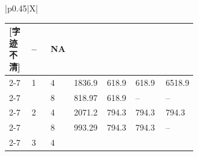\documentclass[UTF8,10pt,a4paper,fontset=fandol]{ctexart}
\newcommand{\fieldvalue}[1]{#1}
\newcommand{\handwritten}[1]{#1}
\begin{document}
\begin{tabularx}{\textwidth}{|p{0.45\textwidth}|X|}
{\begin{tabularx}{\linewidth}{|p{0.12\linewidth}|p{0.10\linewidth}|p{0.10\linewidth}|X|X|p{0.16\linewidth}|p{0.14\linewidth}|}
\fieldvalue{\handwritten{[字迹不清]}} &
-- & NA \\
\cline{2-7}
& 1 &
\fieldvalue{\handwritten{4}} &
\fieldvalue{\handwritten{1836.9}} &
\fieldvalue{\handwritten{618.9}} &
\fieldvalue{\handwritten{618.9}} &
\fieldvalue{\handwritten{6518.9}} \\
\cline{2-7}
&  &
\fieldvalue{\handwritten{8}} &
\fieldvalue{\handwritten{818.97}} &
\fieldvalue{\handwritten{618.9}} &
-- & -- \\
\cline{2-7}
& 2 &
\fieldvalue{\handwritten{4}} &
\fieldvalue{\handwritten{2071.2}} &
\fieldvalue{\handwritten{794.3}} &
\fieldvalue{\handwritten{794.3}} &
\fieldvalue{\handwritten{794.3}} \\
\cline{2-7}
&  &
\fieldvalue{\handwritten{8}} &
\fieldvalue{\handwritten{993.29}} &
\fieldvalue{\handwritten{794.3}} &
\fieldvalue{\handwritten{794.3}} &
-- \\
\cline{2-7}
& 3 &
\fieldvalue{\handwritten{4}} &

\end{tabularx}}
\end{tabularx}
\end{document}

